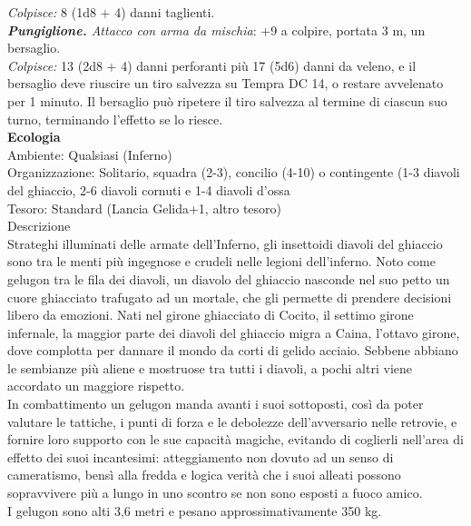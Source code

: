 \begin{multicols}{2}
\emph{Colpisce:} 8 (1d8 + 4) danni taglienti.\\
\emph{\textbf{Pungiglione.} Attacco con arma da mischia}: +9 a colpire, portata 3 m, un bersaglio.\\
\emph{Colpisce:} 13 (2d8 + 4) danni perforanti più 17 (5d6) danni da veleno, e il bersaglio deve riuscire un tiro salvezza su Tempra DC 14, o restare avvelenato per 1 minuto. Il bersaglio può ripetere il tiro salvezza al termine di ciascun suo turno, terminando l'effetto se lo riesce.\\
\textbf{Ecologia}\\
Ambiente: Qualsiasi (Inferno)\\
Organizzazione: Solitario, squadra (2-3), concilio (4-10) o contingente (1-3 diavoli del ghiaccio, 2-6 diavoli cornuti e 1-4 diavoli d'ossa\\
Tesoro: Standard (Lancia Gelida+1, altro tesoro)\\
Descrizione\\
Strateghi illuminati delle armate dell’Inferno, gli insettoidi diavoli del ghiaccio sono tra le menti più ingegnose e crudeli nelle legioni dell'inferno. Noto come gelugon tra le fila dei diavoli, un diavolo del ghiaccio nasconde nel suo petto un cuore ghiacciato trafugato ad un mortale, che gli permette di prendere decisioni libero da emozioni. Nati nel girone ghiacciato di Cocito, il settimo girone infernale, la maggior parte dei diavoli del ghiaccio migra a Caina, l’ottavo girone, dove complotta per dannare il mondo da corti di gelido acciaio. Sebbene abbiano le sembianze più aliene e mostruose tra tutti i diavoli, a pochi altri viene accordato un maggiore rispetto.\\
In combattimento un gelugon manda avanti i suoi sottoposti, così da poter valutare le tattiche, i punti di forza e le debolezze dell’avversario nelle retrovie, e fornire loro supporto con le sue capacità magiche, evitando di coglierli nell'area di effetto dei suoi incantesimi: atteggiamento non dovuto ad un senso di cameratismo, bensì alla fredda e logica verità che i suoi alleati possono sopravvivere più a lungo in uno scontro se non sono esposti a fuoco amico.\\
I gelugon sono alti 3,6 metri e pesano approssimativamente 350 kg.\\


\end{multicols}

